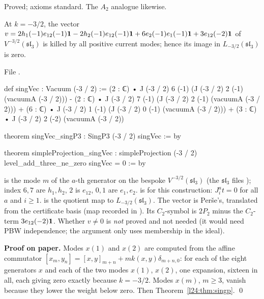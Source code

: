 \begin{status}
Proved; axioms standard. The $A_2$ analogue likewise.
\end{status}

\begin{theorem}\label{l24:thm:A2sing}
At $k=-3/2$, the vector $v=2h_1(-1)e_{12}(-1)\mathbf 1-2h_2(-1)e_{12}(-1)\mathbf 1+6e_2(-1)e_1(-1)\mathbf 1+3e_{12}(-2)\mathbf 1$ of
$V^{-3/2}(\mathfrak{sl}_3)$ is killed by all positive current modes; hence its image in
$L_{-3/2}(\mathfrak{sl}_3)$ is zero.
\end{theorem}
\noindent File .
\begin{leancode}
def singVec : Vacuum (-3 / 2) :=
  (2 : ℂ) • J (-3 / 2) 6 (-1) (J (-3 / 2) 2 (-1) (vacuumA (-3 / 2)))
    - (2 : ℂ) • J (-3 / 2) 7 (-1) (J (-3 / 2) 2 (-1) (vacuumA (-3 / 2)))
    + (6 : ℂ) • J (-3 / 2) 1 (-1) (J (-3 / 2) 0 (-1) (vacuumA (-3 / 2)))
    + (3 : ℂ) • J (-3 / 2) 2 (-2) (vacuumA (-3 / 2))

theorem singVec_singP3 : SingP3 (-3 / 2) singVec := by

theorem simpleProjection_singVec :
    simpleProjection (-3 / 2) level_add_three_ne_zero singVec = 0 := by
\end{leancode}

\begin{dictionary}
 is the mode $m$ of the $a$-th generator on the bespoke $V^{-3/2}(\mathfrak{sl}_3)$
(the $\mathfrak{sl}_3$ files ); index $6,7$ are $h_1,h_2$, $2$ is $e_{12}$, $0,1$ are
$e_1,e_2$.  is  for this construction: $J^a_i t=0$ for all $a$ and $i\ge1$.  is the quotient map to $L_{-3/2}(\mathfrak{sl}_3)$. The vector is Perše's,
translated from the certificate basis (map recorded in ). Its $C_2$-symbol is
$2P_2$ minus the $C_2$-term $3e_{12}(-2)\mathbf 1$. Whether $v\neq0$ is \emph{not} proved and not
needed (it would need PBW independence; the argument only uses membership in the ideal).
\end{dictionary}

\textbf{Proof on paper.} Modes $x(1)$ and $x(2)$ are computed from the affine commutator
$[x_m,y_n]=[x,y]_{m+n}+mk(x,y)\delta_{m+n,0}$: for each of the eight generators $x$ and each of the two modes $x(1)$,
$x(2)$, one expansion, sixteen in all, each giving zero exactly because $k=-3/2$. Modes $x(m)$, $m\ge3$, vanish because they lower the weight below zero. Then
Theorem~\ref{l24:thm:singp}. \qed

